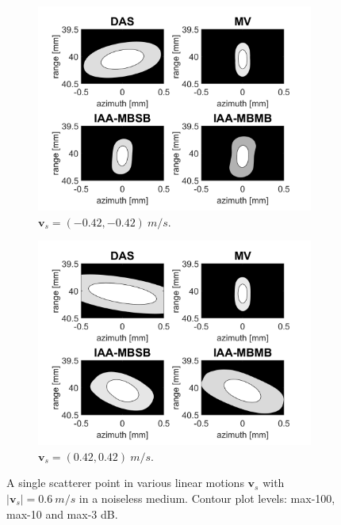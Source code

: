 \begin{figure}[ht]
\begin{subfigure}[t]{0.48\linewidth}
        \includegraphics[width=\linewidth]{./images/results/2.1/motion_45_-06.png}
        \caption{$\boldsymbol{v}_s = (-0.42, -0.42)~m/s$.}
    \end{subfigure}
    \quad
    \begin{subfigure}[t]{0.48\linewidth}
        \includegraphics[width=\linewidth]{./images/results/2.1/motion_45_06.png}
        \caption{$\boldsymbol{v}_s = (0.42, 0.42)~m/s$.}
    \end{subfigure}
	\caption[A single scatterer point in various linear motions $\boldsymbol{v}_s$ with $|\boldsymbol{v}_s|=0.6~m/s$ in a noiseless medium.]{A single scatterer point in various linear motions $\boldsymbol{v}_s$ with $|\boldsymbol{v}_s|=0.6~m/s$ in a noiseless medium. Contour plot levels: max-100, max-10 and max-3 dB.}
	\label{fig:linear_motion}
\end{figure}


